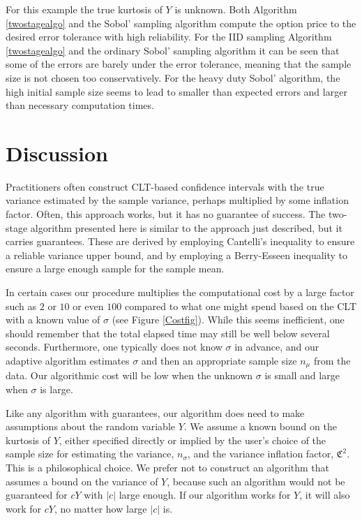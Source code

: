 \documentclass[graybox]{svmult}
\newcommand{\fudge}{\mathfrak{C}}
\newcommand{\abs}[1]{\left|#1\right|}
\def\abs#1{\ensuremath{\left \lvert #1 \right \rvert}}
\begin{document}
For this example the true kurtosis of $Y$ is unknown.  
Both  Algorithm \ref{twostagealgo} and the  Sobol' sampling algorithm compute the option price to the desired error tolerance with high reliability.  For the IID sampling Algorithm \ref{twostagealgo} and the ordinary Sobol' sampling algorithm it can be seen that some of the errors are barely under the error tolerance, meaning that the sample size is not 
chosen too conservatively.  For the heavy duty Sobol' algorithm, the high initial sample size seems to lead to smaller than expected errors and larger than necessary 
computation times.

\section{Discussion} \label{discusssec}

Practitioners often construct CLT-based confidence intervals with the true variance estimated by the sample variance, perhaps multiplied by some inflation factor.  Often, this approach works, but it has no guarantee of success.  The two-stage algorithm presented here is similar to the approach just described, but it carries guarantees. These are derived by employing Cantelli's inequality to ensure a reliable variance upper bound, and by employing a Berry-Esseen inequality to ensure a large enough sample for the sample mean.  

In certain cases our procedure multiplies the computational cost by a large factor such as $2$ or $10$ or even $100$ compared to what one might spend based on the CLT with a known value of $\sigma$ (see Figure \ref{Costfig}).  While this seems inefficient, one should remember that the total elapsed time may still be well below several seconds.  Furthermore, one typically does not know $\sigma$ in advance, and our adaptive algorithm estimates $\sigma$ and then an appropriate sample size $n_\mu$ from the data.  Our algorithmic cost will be low when the unknown $\sigma$ is small and large when $\sigma$ is large.

Like any algorithm with guarantees, our algorithm does need to make assumptions about the random variable $Y$.  We assume a known bound on the kurtosis of $Y$, either specified directly or implied by the user's choice of the sample size for estimating the variance, $n_\sigma$, and the variance inflation factor, $\fudge^2$.  This is a philosophical choice.  We prefer not to construct an algorithm that assumes a bound on the variance of 
$Y$, because such an algorithm would not be guaranteed for $cY$ with $\abs{c}$ large enough.  If our algorithm works for $Y$, it will also work for $cY$, no matter how large $\abs{c}$ is. 
\end{document}
